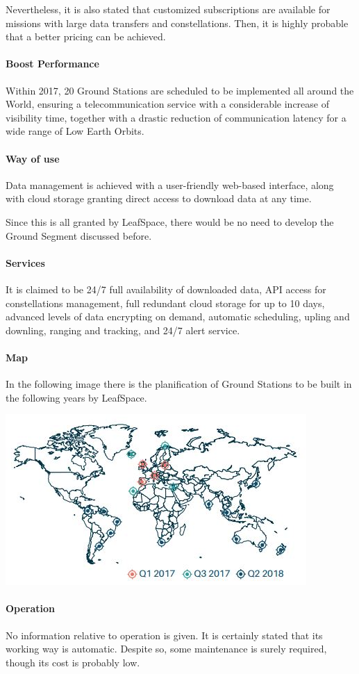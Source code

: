 Nevertheless, it is also stated that customized subscriptions are available for missions with large data transfers and constellations. Then, it is highly probable that a better pricing can be achieved. 

\paragraph{Boost Performance}
Within 2017, 20 Ground Stations are scheduled to be implemented all around the World, ensuring a telecommunication service with a considerable increase of visibility time, together with a drastic reduction of communication latency for a wide range of Low Earth Orbits. 

\paragraph{Way of use}
Data management is achieved with a user-friendly web-based interface, along with cloud storage granting direct access to download data at any time. 

Since this is all granted by LeafSpace, there would be no need to develop the Ground Segment discussed before. 

\paragraph{Services}
It is claimed to be 24/7 full availability of downloaded data, API access for constellations management, full redundant cloud storage for up to 10 days, advanced levels of data encrypting on demand, automatic scheduling, upling and downling, ranging and tracking, and 24/7 alert service. 

\paragraph{Map}
In the following image there is the planification of Ground Stations to be built in the following years by LeafSpace. 

\includegraphics{LeafSpace.jpg}

\paragraph{Operation}
No information relative to operation is given. It is certainly stated that its working way is automatic. Despite so, some maintenance is surely required, though its cost is probably low.

